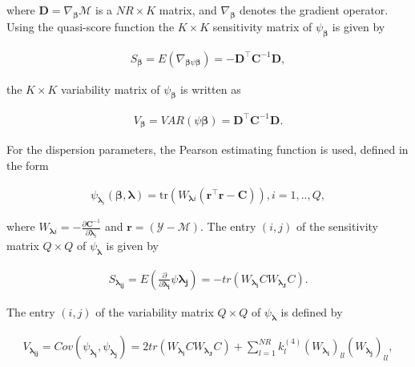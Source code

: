 \documentclass[Review,sagev,times, doublespace]{sagej}
\begin{document}
\noindent where $\boldsymbol{D} = \nabla_{\boldsymbol{\beta}} \mathcal{M}$ is a $NR \times K$ matrix, and $\nabla_{\boldsymbol{\beta}}$ denotes the gradient operator. Using the quasi-score function the $K \times K$ sensitivity matrix of $\psi_{\boldsymbol{\beta}}$ is given by

$$
\begin{aligned}
S_{\boldsymbol{\beta}} = E(\nabla_{\boldsymbol{\beta} \psi \boldsymbol{\beta}}) = -\boldsymbol{D}^{\top} \boldsymbol{C}^{-1} \boldsymbol{D},
\end{aligned}
$$

\noindent the $K \times K$ variability matrix of $\psi_{\boldsymbol{\beta}}$ is written as

$$
\begin{aligned}
V_{\boldsymbol{\beta}} = VAR(\psi \boldsymbol{\beta}) = \boldsymbol{D}^{\top} \boldsymbol{C}^{-1} \boldsymbol{D}.
\end{aligned}
$$

For the dispersion parameters, the Pearson estimating function is used, defined in the form

$$
  \begin{aligned}
    \psi_{\boldsymbol{\lambda}_i}(\boldsymbol{\beta},
    \boldsymbol{\lambda}) =
    \mathrm{tr}(W_{\boldsymbol{\lambda}i}
    (\boldsymbol{r}^\top\boldsymbol{r} -
    \boldsymbol{C})),  i = 1,.., Q, 
  \end{aligned}
$$

\noindent where $W_{\boldsymbol{\lambda}i} = -\frac{\partial \boldsymbol{C}^{-1}}{\partial \boldsymbol{\lambda}_i}$ and $\boldsymbol{ r} = (\mathcal{Y} - \mathcal{M})$. The entry $(i,j)$ of the sensitivity matrix $Q \times Q$ of $\psi_{\boldsymbol{\lambda}}$ is given by

$$
  \begin{aligned}
    S_{\boldsymbol{\lambda_{ij}}} = E \left (\frac{\partial }{\partial \boldsymbol{\lambda_{i}}} \psi \boldsymbol{\lambda_{j}}\right) = -tr(W_{\boldsymbol{\lambda_{i}}} CW_{\boldsymbol{\lambda_{J}}} C).
  \end{aligned}
$$

\noindent The entry $(i,j)$ of the variability matrix $Q \times Q$ of $\psi_{\boldsymbol{\lambda}}$ is defined by

$$
  \begin{aligned}
V_{\boldsymbol{\lambda_{ij}}} = Cov\left ( \psi_{\boldsymbol{\lambda_{i}}}, \psi_{\boldsymbol{\lambda_{j}}} \right) = 2tr(W_{\boldsymbol{\lambda_{i}}} CW_{\boldsymbol{\lambda_{J}}} C) + \sum_{l=1}^{NR} k_{l}^{(4)} (W_{\boldsymbol{\lambda_{i}}})_{ll} (W_{\boldsymbol{\lambda_{j}}})_{ll},
  \end{aligned}
$$
\end{document}
